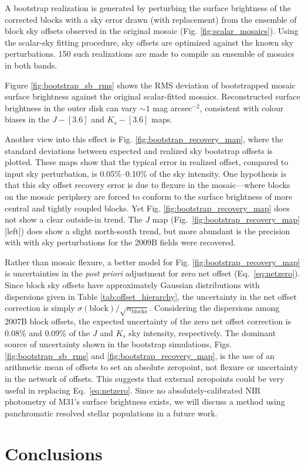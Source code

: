 \documentclass[iop]{emulateapj}
\begin{document}
A bootstrap realization is generated by perturbing the surface brightness of the corrected blocks with a sky error drawn (with replacement) from the ensemble of block sky offsets observed in the original mosaic (Fig. \ref{fig:scalar_mosaics}). Using the scalar-sky fitting procedure, sky offsets  are optimized against the known sky perturbations. 150 such realizations are made to compile an ensemble of mosaics in both bands.

Figure \ref{fig:bootstrap_sb_rms} shows the RMS deviation of bootstrapped mosaic surface brightness against the original scalar-fitted mosaics. Reconstructed surface brightness in the outer disk can vary $\sim 1$ mag arcsec$^{-2}$, consistent with colour biases in the $J-[3.6]$ and $K_s-[3.6]$ maps.

Another view into this effect is Fig. \ref{fig:bootstrap_recovery_map}, where the standard deviations between expected and realized sky bootstrap offsets is plotted. These maps show that the typical error in realized offset, compared to input sky perturbation, is 0.05\%--0.10\% of the sky intensity. One hypothesis is that this sky offset recovery error is due to flexure in the mosaic---where blocks on the mosaic periphery are forced to conform to the surface brightness of more central and tightly coupled blocks. Yet Fig. \ref{fig:bootstrap_recovery_map} does not show a clear outside-in trend. The $J$ map (Fig.~\ref{fig:bootstrap_recovery_map} [left]) does show a slight north-south trend, but more abundant is the precision with with sky perturbations for the 2009B fields were recovered.

Rather than mosaic flexure, a better model for Fig. \ref{fig:bootstrap_recovery_map} is uncertainties in the \textit{post priori} adjustment for zero net offset (Eq.~\ref{eq:netzero}). Since block sky offsets have approximately Gaussian distributions with dispersions given in Table \ref{tab:offset_hierarchy}, the uncertainty in the net offset correction is simply $\sigma(\mathrm{block})/\sqrt{n_\mathrm{blocks}}$. Considering the dispersions among 2007B block offsets, the expected uncertainty of the zero net offset correction is 0.08\% and 0.09\% of the $J$ and $K_s$ sky intensity, respectively. The dominant source of uncertainty shown in the bootstrap simulations, Figs. \ref{fig:bootstrap_sb_rms} and \ref{fig:bootstrap_recovery_map}, is the use of an arithmetic mean of offsets to set an absolute zeropoint, not flexure or uncertainty in the network of offsets. This suggests that external zeropoints could be very useful in replacing Eq.~\ref{eq:netzero}. Since no absolutely-calibrated NIR photometry of M31's surface brightness exists, we will discuss a method using panchromatic resolved stellar populations in a future work.

\section{Conclusions}
\label{sec:conclusions}


\end{document}
